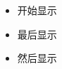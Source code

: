 \begin{frame}
\begin{itemize}
  \item<1-> 开始显示
  \item<3-> 最后显示
  \item<2-> 然后显示
\end{itemize}
\end{frame}
